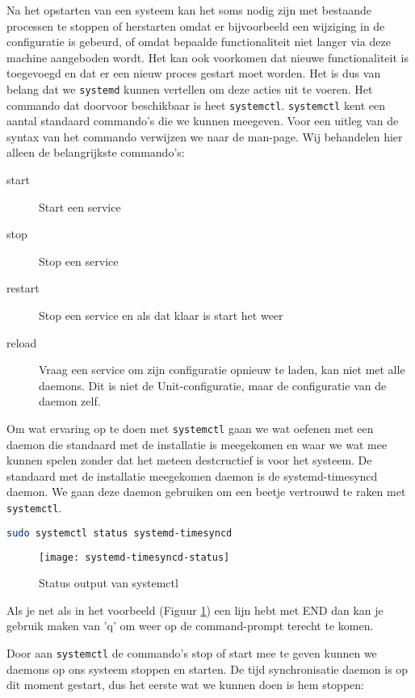 Na het opstarten van een systeem kan het soms nodig zijn met bestaande processen te stoppen of herstarten omdat er bijvoorbeeld een wijziging in de configuratie is gebeurd, of omdat bepaalde functionaliteit niet langer via deze machine aangeboden wordt. Het kan ook voorkomen dat nieuwe functionaliteit is toegevoegd en dat er een nieuw proces gestart moet worden. Het is dus van belang dat we \texttt{systemd} kunnen vertellen om deze acties uit te voeren. Het commando dat doorvoor beschikbaar is heet \texttt{systemctl}. \texttt{systemctl} kent een aantal standaard commando's die we kunnen meegeven. Voor een uitleg van de syntax van het commando verwijzen we naar de man-page. Wij behandelen hier alleen de belangrijkste commando's:
\begin{description}
	\item[start] Start een service
	\item[stop] Stop een service
	\item[restart] Stop een service en als dat klaar is start het weer
	\item[reload] Vraag een service om zijn configuratie opnieuw te laden, kan niet met alle daemons. Dit is niet de Unit-configuratie, maar de configuratie van de daemon zelf.
\end{description}

Om wat ervaring op te doen met \texttt{systemctl} gaan we wat oefenen met een daemon die standaard met de installatie is meegekomen en waar we wat mee kunnen spelen zonder dat het meteen destcructief is voor het systeem. De standaard met de installatie meegekomen daemon is de systemd-timesyncd daemon. We gaan deze daemon gebruiken om een beetje vertrouwd te raken met \texttt{systemctl}.

\begin{lstlisting}[language=bash]
sudo systemctl status systemd-timesyncd
\end{lstlisting}

\begin{figure}[h]
\texttt{[image: systemd-timesyncd-status]}
\centering
	\caption{Status output van systemctl}
	\label{scrn:systemd-timesyncd-status}
\end{figure}

Als je net als in het voorbeeld (Figuur \ref{scrn:systemd-timesyncd-status}) een lijn hebt met END dan kan je gebruik maken van 'q' om weer op de command-prompt terecht te komen.

Door aan \texttt{systemctl} de commando's stop of start mee te geven kunnen we daemons op ons systeem stoppen en starten. De tijd synchronisatie daemon is op dit moment gestart, dus het eerste wat we kunnen doen is hem stoppen:

